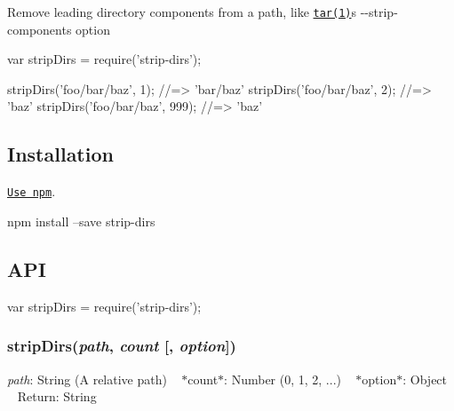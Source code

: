 \href{https://www.npmjs.com/package/strip-dirs}{\tt } \href{https://travis-ci.org/shinnn/node-strip-dirs}{\tt } \href{https://ci.appveyor.com/project/ShinnosukeWatanabe/node-strip-dirs}{\tt } \href{https://coveralls.io/r/shinnn/node-strip-dirs}{\tt } \href{https://david-dm.org/shinnn/node-strip-dirs}{\tt } \href{https://david-dm.org/shinnn/node-strip-dirs#info=devDependencies}{\tt }

Remove leading directory components from a path, like \href{http://linuxcommand.org/man_pages/tar1.html}{\tt tar(1)}\textquotesingle{}s {\ttfamily -\/-\/strip-\/components} option


\begin{DoxyCode}
var stripDirs = require('strip-dirs');

stripDirs('foo/bar/baz', 1); //=> 'bar/baz'
stripDirs('foo/bar/baz', 2); //=> 'baz'
stripDirs('foo/bar/baz', 999); //=> 'baz'
\end{DoxyCode}


\subsection*{Installation}

\href{https://docs.npmjs.com/cli/install}{\tt Use npm}.


\begin{DoxyCode}
npm install --save strip-dirs
\end{DoxyCode}


\subsection*{A\+PI}


\begin{DoxyCode}
var stripDirs = require('strip-dirs');
\end{DoxyCode}


\subsubsection*{strip\+Dirs({\itshape path}, {\itshape count} \mbox{[}, {\itshape option}\mbox{]})}

{\itshape path}\+: {\ttfamily String} (A relative path) ~\newline
$\ast$count$\ast$\+: {\ttfamily Number} (0, 1, 2, ...) ~\newline
$\ast$option$\ast$\+: {\ttfamily Object} ~\newline
Return\+: {\ttfamily String}

